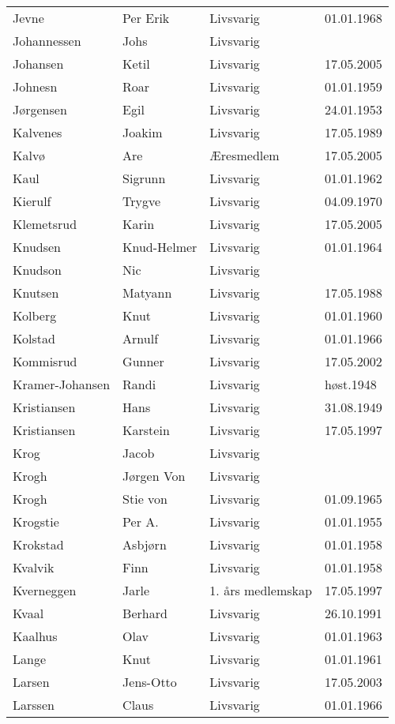 \begin{longtable}{llll}
Jevne	&	Per Erik	&	Livsvarig 	&	01.01.1968	\\
Johannessen	&	Johs	&	Livsvarig 	&		\\
Johansen 	&	Ketil	&	Livsvarig	&	17.05.2005	\\
Johnesn	&	Roar	&	Livsvarig 	&	01.01.1959	\\
Jørgensen	&	Egil	&	Livsvarig 	&	24.01.1953	\\
Kalvenes	&	Joakim	&	Livsvarig 	&	17.05.1989	\\
Kalvø 	&	Are 	&	Æresmedlem	&	17.05.2005	\\
Kaul	&	Sigrunn	&	Livsvarig 	&	01.01.1962	\\
Kierulf	&	Trygve	&	Livsvarig 	&	04.09.1970	\\
Klemetsrud 	&	Karin	&	Livsvarig	&	17.05.2005	\\
Knudsen	&	Knud-Helmer	&	Livsvarig 	&	01.01.1964	\\
Knudson	&	Nic	&	Livsvarig 	&		\\
Knutsen	&	Matyann	&	Livsvarig 	&	17.05.1988	\\
Kolberg	&	Knut	&	Livsvarig 	&	01.01.1960	\\
Kolstad	&	Arnulf	&	Livsvarig 	&	01.01.1966	\\
Kommisrud 	&	Gunner	&	Livsvarig	&	17.05.2002	\\
Kramer-Johansen	&	Randi	&	Livsvarig 	&	høst.1948	\\
Kristiansen	&	Hans	&	Livsvarig 	&	31.08.1949	\\
Kristiansen 	&	Karstein	&	Livsvarig	&	17.05.1997	\\
Krog	&	Jacob	&	Livsvarig 	&		\\
Krogh	&	Jørgen Von	&	Livsvarig 	&		\\
Krogh	&	Stie von	&	Livsvarig 	&	01.09.1965	\\
Krogstie	&	Per A.	&	Livsvarig 	&	01.01.1955	\\
Krokstad	&	Asbjørn	&	Livsvarig 	&	01.01.1958	\\
Kvalvik	&	Finn	&	Livsvarig 	&	01.01.1958	\\
Kverneggen 	&	Jarle 	&	1. års medlemskap	&	17.05.1997	\\
Kvaal	&	Berhard	&	Livsvarig 	&	26.10.1991	\\
Kaalhus	&	Olav	&	Livsvarig 	&	01.01.1963	\\
Lange	&	Knut	&	Livsvarig 	&	01.01.1961	\\
Larsen 	&	Jens-Otto	&	Livsvarig	&	17.05.2003	\\
Larssen	&	Claus	&	Livsvarig 	&	01.01.1966	\\

\end{longtable}
